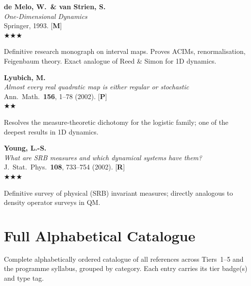 \documentclass[11pt,a4paper]{article}
\newcommand{\essential}{$\bigstar\bigstar\bigstar$}
\newcommand{\recommended}{$\bigstar\bigstar$}
\newenvironment{bibentry}[1]{%
  \begin{tcolorbox}[entrybox=#1, top=4pt, bottom=4pt]%
}{%
  \end{tcolorbox}\smallskip%
}
\begin{document}
\begin{bibentry}{t5light}
\textbf{de Melo, W.\ \& van Strien, S.}\\
\textit{One-Dimensional Dynamics}\\
Springer, 1993. [\textbf{M}]\\[4pt]
\essential\\[4pt]
\begin{tcolorbox}[annotbox]
Definitive research monograph on interval maps. Proves ACIMs, renormalisation,
Feigenbaum theory. Exact analogue of Reed \& Simon for 1D dynamics.
\end{tcolorbox}
\end{bibentry}

\begin{bibentry}{t5light}
\textbf{Lyubich, M.}\\
\textit{Almost every real quadratic map is either regular or stochastic}\\
Ann.~Math.~\textbf{156}, 1--78 (2002). [\textbf{P}]\\[4pt]
\recommended\\[4pt]
\begin{tcolorbox}[annotbox]
Resolves the measure-theoretic dichotomy for the logistic family; one of the deepest
results in 1D dynamics.
\end{tcolorbox}
\end{bibentry}

\begin{bibentry}{t5light}
\textbf{Young, L.-S.}\\
\textit{What are SRB measures and which dynamical systems have them?}\\
J.~Stat.~Phys.~\textbf{108}, 733--754 (2002). [\textbf{R}]\\[4pt]
\essential\\[4pt]
\begin{tcolorbox}[annotbox]
Definitive survey of physical (SRB) invariant measures; directly analogous to
density operator surveys in QM.
\end{tcolorbox}
\end{bibentry}

\newpage
\section{Full Alphabetical Catalogue}
\label{sec:fullcat}

\begin{tcolorbox}[keybox]
Complete alphabetically ordered catalogue of all references across Tiers~1--5 and the
programme syllabus, grouped by category. Each entry carries its tier badge(s) and type tag.
\end{tcolorbox}
\end{document}
